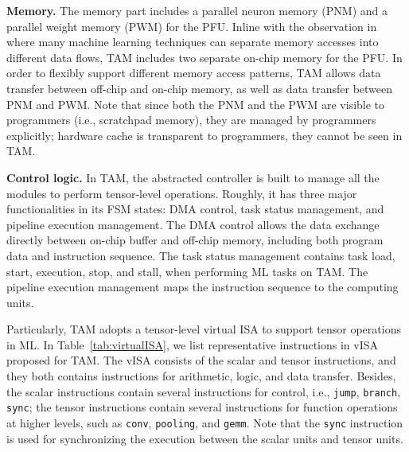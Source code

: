 \textbf{Memory.} The memory part includes a parallel neuron memory (PNM)
and a parallel weight memory (PWM) for the PFU. Inline with the observation in~\cite{pudiannao} where
many machine learning techniques can separate memory
accesses into different data flows, TAM includes two separate on-chip memory
for the PFU. In order to flexibly support different memory access
patterns, TAM allows data transfer between off-chip and on-chip
memory, as well as data transfer between PNM and PWM. Note that since
both the PNM and the PWM are visible
to programmers (i.e., scratchpad memory), they are managed by programmers
explicitly; hardware cache is transparent to programmers, they cannot be seen in TAM.


\textbf{Control logic.}
In TAM, the abstracted controller is built to manage all the modules to
perform tensor-level operations. Roughly, it has three major functionalities in
its FSM states: DMA control, task status management, and pipeline execution
management. The DMA control allows the data exchange directly between on-chip
buffer and off-chip memory, including both program data and instruction
sequence. The task status management contains task load, start, execution,
stop, and stall, when performing ML tasks on TAM. The pipeline execution
management maps the instruction sequence to the computing units. 


Particularly, TAM adopts a tensor-level virtual ISA to support tensor
operations in ML. In
Table~\ref{tab:virtualISA}, we list representative instructions in vISA proposed for
TAM. The vISA consists of the scalar and tensor instructions,
and they both contains instructions for arithmetic, logic, and data
transfer. Besides, the scalar instructions contain several instructions for
control, i.e., \texttt{jump}, \texttt{branch}, \texttt{sync}; the tensor instructions
contain several instructions for function operations at higher levels, such as
\texttt{conv}, \texttt{pooling}, and \texttt{gemm}. Note that the
\texttt{sync} instruction is used for synchronizing the execution between the
scalar units and tensor units. 


